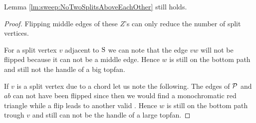     \begin{lemma}
      \label{lm:sweep:NoTwoSplitsAboveEachOtherVertOnesided}
      Lemma \ref{lm:sweep:NoTwoSplitsAboveEachOther} still holds.
    \end{lemma}

    \begin{proof}
      Flipping middle edges of these $Z$'s  can only reduce the number of split vertices.

      For a split vertex $v$ adjacent to $\pS$ we can note that the edge $vw$ will not be flipped because it can not be a middle edge. Hence $w$ is still on the bottom path and still not the handle of a big topfan.

      If $v$ is a split vertex due to a chord let us note the following.
      The edges of $\P$ and $ab$ can not have been flipped since then we would find a monochromatic red triangle while a flip leads to another valid \rel. Hence $w$ is still on the bottom path trough $v$ and still can not be the handle of a large topfan.
    \end{proof}

